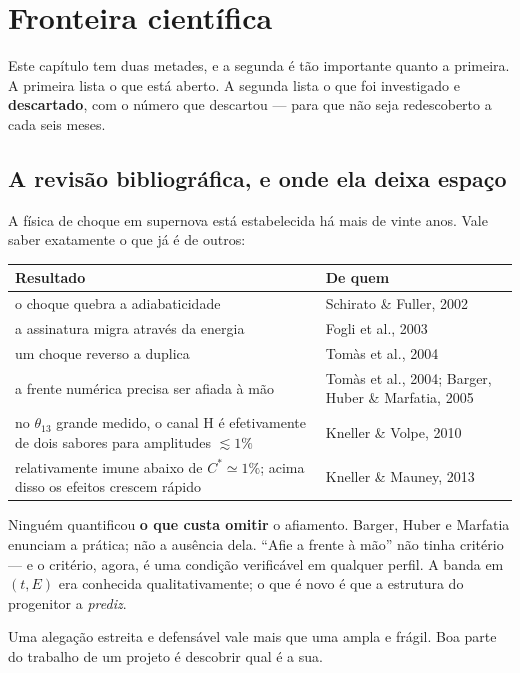 \chapter{Fronteira científica}
\label{cap:fronteira}

Este capítulo tem duas metades, e a segunda é tão importante quanto a primeira.
A primeira lista o que está aberto. A segunda lista o que foi investigado e
\textbf{descartado}, com o número que descartou --- para que não seja
redescoberto a cada seis meses.

\section{A revisão bibliográfica, e onde ela deixa espaço}

A física de choque em supernova está estabelecida há mais de vinte anos. Vale
saber exatamente o que já é de outros:

\begin{center}
\begin{tabular}{@{}>{\small}p{7.4cm} >{\sffamily\small}p{4.6cm}@{}}
\toprule
\small\bfseries Resultado & \sffamily\bfseries\small De quem \\
\midrule
o choque quebra a adiabaticidade & Schirato \& Fuller, 2002 \\
a assinatura migra através da energia & Fogli et al., 2003 \\
um choque reverso a duplica & Tomàs et al., 2004 \\
a frente numérica precisa ser afiada à mão & Tomàs et al., 2004; Barger, Huber \& Marfatia, 2005 \\
no $\theta_{13}$ grande medido, o canal H é efetivamente de dois sabores para amplitudes $\lesssim 1\%$ & Kneller \& Volpe, 2010 \\
relativamente imune abaixo de $C^{*}\simeq1\%$; acima disso os efeitos crescem rápido & Kneller \& Mauney, 2013 \\
\bottomrule
\end{tabular}
\end{center}

\begin{nota}
Ninguém quantificou \textbf{o que custa omitir} o afiamento. Barger, Huber e
Marfatia enunciam a prática; não a ausência dela. ``Afie a frente à mão'' não
tinha critério --- e o critério, agora, é uma condição verificável em qualquer
perfil. A banda em $(t,E)$ era conhecida qualitativamente; o que é novo é que a
estrutura do progenitor a \emph{prediz}.

\medskip
Uma alegação estreita e defensável vale mais que uma ampla e frágil. Boa parte
do trabalho de um projeto é descobrir qual é a sua.
\end{nota}

